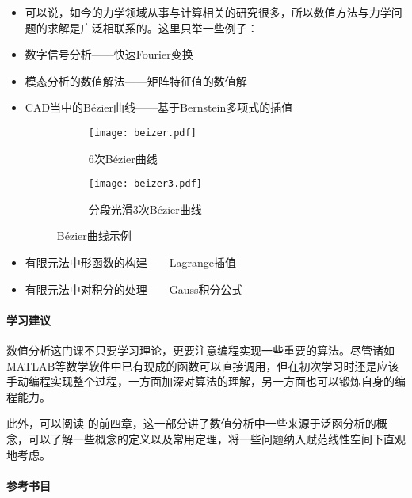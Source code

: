 \begin{itemize}
    \item 可以说，如今的力学领域从事与计算相关的研究很多，所以数值方法与力学问题的求解是广泛相联系的。这里只举一些例子：

    \item 数字信号分析——快速Fourier变换

    \item 模态分析的数值解法——矩阵特征值的数值解

    \item CAD当中的B\'ezier曲线——基于Bernstein多项式的插值
          \begin{figure}[ht]
              \centering
              \begin{subfigure}[t]{0.45\textwidth}\centering
                  \texttt{[image: beizer.pdf]}
                  \caption{$6$次B\'ezier曲线  }
              \end{subfigure}
              \begin{subfigure}[t]{0.45\textwidth}\centering
                  \texttt{[image: beizer3.pdf]}
                  \caption{分段光滑$3$次B\'ezier曲线}
              \end{subfigure}
              \caption{B\'ezier曲线示例}
          \end{figure}
    \item 有限元法中形函数的构建——Lagrange插值

    \item 有限元法中对积分的处理——Gauss积分公式

\end{itemize}
\paragraph{学习建议}

数值分析这门课不只要学习理论，更要注意编程实现一些重要的算法。尽管诸如MATLAB等数学软件中已有现成的函数可以直接调用，但在初次学习时还是应该手动编程实现整个过程，一方面加深对算法的理解，另一方面也可以锻炼自身的编程能力。

此外，可以阅读 \textcite[数值泛函及其应用]{张维强2021} 的前四章，这一部分讲了数值分析中一些来源于泛函分析的概念，可以了解一些概念的定义以及常用定理，将一些问题纳入赋范线性空间下直观地考虑。

\paragraph{参考书目}

